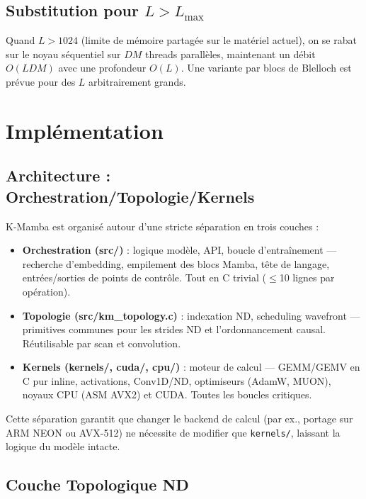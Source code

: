 \documentclass[10pt,onecolumn]{article}
\begin{document}
\subsection{Substitution pour $L > L_{\max}$}

Quand $L > 1024$ (limite de mémoire partagée sur le matériel actuel), on se rabat
sur le noyau séquentiel sur $DM$ threads parallèles, maintenant un débit
$O(LDM)$ avec une profondeur $O(L)$. Une variante par blocs de Blelloch
est prévue pour des $L$ arbitrairement grands.

\section{Implémentation}
\label{sec:implementation}

\subsection{Architecture : Orchestration/Topologie/Kernels}

K-Mamba est organisé autour d'une stricte séparation en trois couches :

\begin{itemize}
  \item \textbf{Orchestration (src/)} : logique modèle, API, boucle d'entraînement —
        recherche d'embedding, empilement des blocs Mamba, tête de langage,
        entrées/sorties de points de contrôle.
        Tout en C trivial ($\leq$10 lignes par opération).
  \item \textbf{Topologie (src/km\_topology.c)} : indexation ND, scheduling wavefront —
        primitives communes pour les strides ND et l'ordonnancement causal. Réutilisable par scan et convolution.
  \item \textbf{Kernels (kernels/, cuda/, cpu/)} : moteur de calcul —
        GEMM/GEMV en C pur inline, activations, Conv1D/ND, optimiseurs (AdamW, MUON),
        noyaux CPU (ASM AVX2) et CUDA. Toutes les boucles critiques.
\end{itemize}

Cette séparation garantit que changer le backend de calcul (par ex., portage
sur ARM NEON ou AVX-512) ne nécessite de modifier que \texttt{kernels/},
laissant la logique du modèle intacte.

\subsection{Couche Topologique ND}
\end{document}
